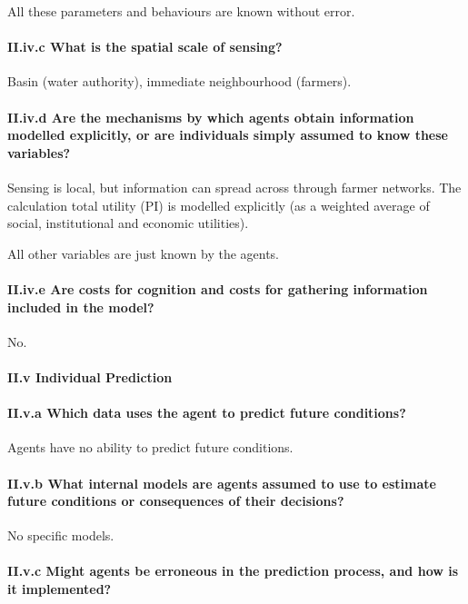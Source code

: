 \documentclass[12pt, a4paper]{article}
\begin{document}
All these parameters and behaviours are known without error.

\paragraph{II.iv.c What is the spatial scale of sensing?}

Basin (water authority), immediate neighbourhood (farmers).

\paragraph{II.iv.d Are the mechanisms by which agents obtain information modelled explicitly, or are individuals simply assumed to know these variables?}

Sensing is local, but information can spread across through farmer networks. The calculation total utility (PI) is modelled explicitly (as a weighted average of social, institutional and economic utilities).

All other variables are just known by the agents.

\paragraph{II.iv.e Are costs for cognition and costs for gathering information inclu­ded in the model?}

No.

\paragraph{II.v Individual Prediction}

\paragraph{II.v.a Which data uses the agent to predict future conditions?}

Agents have no ability to predict future conditions.

\paragraph{II.v.b What internal models are agents assumed to use to estimate future conditions or consequences of their decisions?}

No specific models.

\paragraph{II.v.c Might agents be erroneous in the prediction process, and how is it implemented?}
\end{document}
